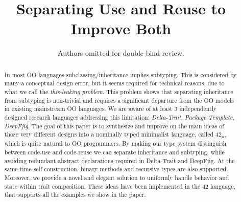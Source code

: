 \documentclass{llncs}
\newcommand\saveSpace{\vspace{-3pt}}
\newcommand\name{{\bf $42_{\mu}$}\xspace}
\begin{document}
%
\frontmatter          %
%
\pagestyle{headings}  %
%

\title{Separating Use and Reuse to Improve Both}
%

\begin{comment}
\author{Marco Servetto\inst{1} \and Bruno C. d. S. Oliveira\inst{2}}
%
\authorrunning{M. Servetto and B. Oliveira} %
%
\tocauthor{Marco Servetto and Bruno C. d. S. Oliveira}
%
\institute{Victoria University of Wellington, New Zealand,\\
\and
The University of Hong Kong, Hong Kong\\}
\end{comment}
\author{Authors omitted for double-bind review.}

\maketitle              %

\begin{abstract}
\saveSpace\saveSpace\saveSpace
In most OO languages subclassing/inheritance implies
subtyping. This is considered by many a conceptual design error, but it
seems required for technical reasons, due to what we call the
\emph{this-leaking problem}. This problem shows that separating
inheritance from subtyping is non-trivial and requires a significant
departure from the OO models in existing mainstream OO languages.
We are aware of at least 3 independently designed research languages 
addressing this limitation: \emph{Delta-Trait}, \emph{Package Template}, \emph{DeepFjig}.
The goal of this paper is to synthesize and improve on
the main ideas of those very different designs into a nominally typed
minimalist language, called \name, which is quite
natural to OO programmers.
By making our type system distinguish between code-use and code-reuse
we can separate inheritance and subtyping, while avoiding 
redundant abstract declarations required in Delta-Trait and
DeepFjig. At the same time self construction,
binary methods and recursive types are also supported.
Moreover, we provide a novel and elegant solution to uniformly
handle behavior and state within trait composition.
These ideas have been implemented in the 42 language, 
that supports all the examples we show in the paper.
\saveSpace\saveSpace\saveSpace

\saveSpace\saveSpace\saveSpace
\end{abstract}






%






\end{document}

